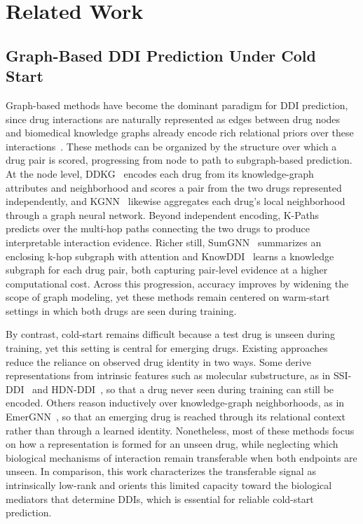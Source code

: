 \documentclass[letterpaper]{article} %
\begin{document}
\section{Related Work}

\subsection{Graph-Based DDI Prediction Under Cold Start}

Graph-based methods have become the dominant paradigm for DDI prediction, since drug interactions are naturally represented as edges between drug nodes and biomedical knowledge graphs already encode rich relational priors over these interactions~\cite{BKG-Hetionet,BKG-Primekg}.
%
These methods can be organized by the structure over which a drug pair is scored, progressing from node to path to subgraph-based prediction. 
%
At the node level, DDKG~\cite{Method-DDKG} encodes each drug from its knowledge-graph attributes and neighborhood and scores a pair from the two drugs represented independently, and KGNN~\cite{Method-KGNN} likewise aggregates each drug's local neighborhood through a graph neural network.
%
Beyond independent encoding, K-Paths~\cite{Method-K_paths} predicts over the multi-hop paths connecting the two drugs to produce interpretable interaction evidence. 
%
Richer still, SumGNN~\cite{Method-Sumgnn} summarizes an enclosing k-hop subgraph with attention and KnowDDI~\cite{Method-Knowddi} learns a knowledge subgraph for each drug pair, both capturing pair-level evidence at a higher computational cost. 
%
Across this progression, accuracy improves by widening the scope of graph modeling, yet these methods remain centered on warm-start settings in which both drugs are seen during training.
%

By contrast, cold-start remains difficult because a test drug is unseen during training, yet this setting is central for emerging drugs. 
%
Existing approaches reduce the reliance on observed drug identity in two ways. Some derive representations from intrinsic features such as molecular substructure, as in SSI-DDI~\cite{Method-SSI_DDI} and HDN-DDI~\cite{Method-HDN_DDI}, so that a drug never seen during training can still be encoded.
%
Others reason inductively over knowledge-graph neighborhoods, as in EmerGNN~\cite{Method-Emergnn}, so that an emerging drug is reached through its relational context rather than through a learned identity. 
%
Nonetheless, most of these methods focus on how a representation is formed for an unseen drug, while neglecting which biological mechanisms of interaction remain transferable when both endpoints are unseen. 
%
In comparison, this work characterizes the transferable signal as intrinsically low-rank and orients this limited capacity toward the biological mediators that determine DDIs, which is essential for reliable cold-start prediction.
\end{document}
